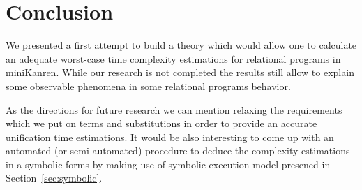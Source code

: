 \documentclass[acmsmall, anonymous, review]{acmart}
\newcommand{\mK}{miniKanren\xspace}
\begin{document}



\maketitle





 



\section{Conclusion}

We presented a first attempt to build a theory which would allow one to calculate an adequate worst-case time
complexity estimations for relational programs in \mK. While our research is not completed the results still
allow to explain some observable phenomena in some relational programs behavior.

As the directions for future research we can mention relaxing the requirements which we put on
terms and substitutions in order to provide an accurate unification time estimations. It would be also
interesting to come up with an automated (or semi-automated) procedure to deduce the complexity
estimations in a symbolic forms by making use of symbolic execution model presened in Section~\ref{sec:symbolic}.

\begin{acks}

\end{acks}




\appendix
\end{document}
